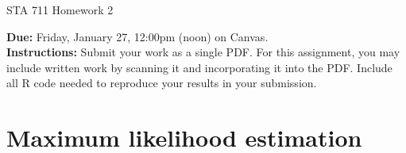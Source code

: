 \documentclass[11pt]{article}
\begin{document}
\begin{center}
\Large
STA 711 Homework 2\\
\normalsize
\vspace{5mm}
\end{center}

\noindent \textbf{Due:} Friday, January 27, 12:00pm (noon) on Canvas.\\ 

\noindent \textbf{Instructions:} Submit your work as a single PDF. For this assignment, you may include written work by scanning it and incorporating it into the PDF. Include all R code needed to reproduce your results in your submission.

\section*{Maximum likelihood estimation}
\end{document}
